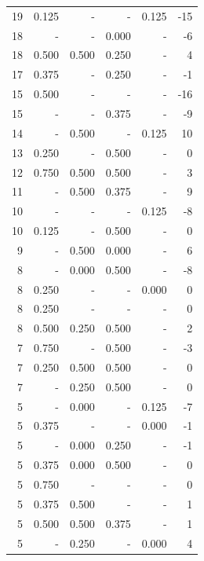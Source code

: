 \documentclass[a4paper]{article}\usepackage[]{graphicx}\usepackage[]{color}
\begin{document}
\begin{table}[ht]
\begin{tabular}{rrrrrr}
   \rowcolor{nullColor} 19 & 0.125 & - & - & 0.125 & -15 \\ 
   \rowcolor{sosoColor} 18 & - & - & 0.000 & - & -6 \\ 
   \rowcolor{badColor} 18 & 0.500 & 0.500 & 0.250 & - & 4 \\ 
   \rowcolor{sosoColor} 17 & 0.375 & - & 0.250 & - & -1 \\ 
   \rowcolor{nullColor} 15 & 0.500 & - & - & - & -16 \\ 
   \rowcolor{sosoColor} 15 & - & - & 0.375 & - & -9 \\ 
  14 & - & 0.500 & - & 0.125 & 10 \\ 
   \rowcolor{sosoColor} 13 & 0.250 & - & 0.500 & - & 0 \\ 
   \rowcolor{goodColor} 12 & 0.750 & 0.500 & 0.500 & - & 3 \\ 
  11 & - & 0.500 & 0.375 & - & 9 \\ 
   \rowcolor{nullColor} 10 & - & - & - & 0.125 & -8 \\ 
   \rowcolor{sosoColor} 10 & 0.125 & - & 0.500 & - & 0 \\ 
   \rowcolor{badColor} 9 & - & 0.500 & 0.000 & - & 6 \\ 
   \rowcolor{badColor} 8 & - & 0.000 & 0.500 & - & -8 \\ 
   \rowcolor{nullColor} 8 & 0.250 & - & - & 0.000 & 0 \\ 
   \rowcolor{nullColor} 8 & 0.250 & - & - & - & 0 \\ 
   \rowcolor{badColor} 8 & 0.500 & 0.250 & 0.500 & - & 2 \\ 
   \rowcolor{sosoColor} 7 & 0.750 & - & 0.500 & - & -3 \\ 
   \rowcolor{goodColor} 7 & 0.250 & 0.500 & 0.500 & - & 0 \\ 
   \rowcolor{badColor} 7 & - & 0.250 & 0.500 & - & 0 \\ 
  5 & - & 0.000 & - & 0.125 & -7 \\ 
   \rowcolor{nullColor} 5 & 0.375 & - & - & 0.000 & -1 \\ 
   \rowcolor{badColor} 5 & - & 0.000 & 0.250 & - & -1 \\ 
   \rowcolor{badColor} 5 & 0.375 & 0.000 & 0.500 & - & 0 \\ 
   \rowcolor{nullColor} 5 & 0.750 & - & - & - & 0 \\ 
  5 & 0.375 & 0.500 & - & - & 1 \\ 
  5 & 0.500 & 0.500 & 0.375 & - & 1 \\ 
  5 & - & 0.250 & - & 0.000 & 4 \\ 

\end{tabular}
\end{table}
\end{document}

